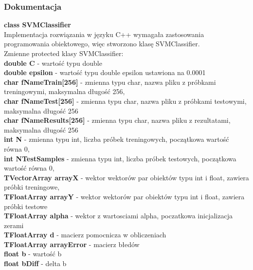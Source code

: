 \documentclass[[10pt,a4paper]{article}
\begin{document}
\begin{enumerate}
\subsubsection{Dokumentacja}

\textbf{class SVMClassifier}\\ Implementacja rozwiązania w języku C++ wymagała zastosowania programowania obiektowego, więc stworzono klasę SVMClassifier. \\

Zmienne protected klasy SVMClassifier:\\
\textbf{double C} - wartość typu double\\
\textbf{double epsilon} - wartość typu double epsilon ustawiona na 0.0001\\
\textbf{char fNameTrain[256]} - zmienna typu char, nazwa pliku z próbkami treningowymi, maksymalna długość 256,\\
\textbf{char fNameTest[256]} -  zmienna typu char, nazwa pliku z próbkami testowymi, maksymalna długość 256\\
\textbf{char fNameResults[256]} -  zmienna typu char, nazwa pliku z rezultatami, maksymalna długość 256\\  
\textbf{int N }- zmienna typu int, liczba próbek treningowych, początkowa wartość równa 0,\\
\textbf{int NTestSamples} - zmienna typu int, liczba próbek testowych, początkowa wartość równa 0,\\
\textbf{TVectorArray arrayX} - wektor wektorów par obiektów typu int i float, zawiera próbki treningowe,\\
\textbf{TFloatArray arrayY }- wektor wektorów par obiektów typu int i float, zawiera próbki testowe\\
\textbf{TFloatArray alpha} - wektor z wartosciami alpha, poczatkowa inicjalizacja zerami\\
\textbf{TFloatArray d }- macierz pomocnicza w obliczeniach\\
\textbf{TFloatArray arrayError }- macierz błedów \\
\textbf{float b }- wartość b\\
\textbf{float bDiff }- delta b\\


\end{enumerate}
\end{document}
